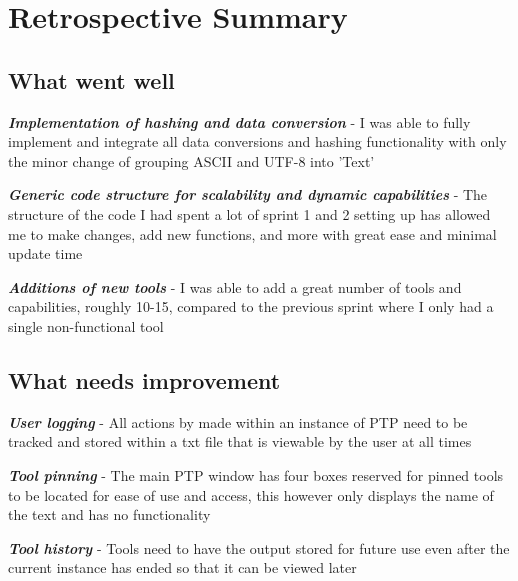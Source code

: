 \documentclass{article}
\begin{document}
\newpage
\section{Retrospective Summary}
\subsection{What went well}
\begin{center}
    \textbf{\textit{Implementation of hashing and data conversion}} - I was able to fully implement and integrate all data conversions and hashing functionality with only the minor change of grouping ASCII and UTF-8 into 'Text'
\end{center}
\begin{center}
    \textbf{\textit{Generic code structure for scalability and dynamic capabilities}} - The structure of the code I had spent a lot of sprint 1 and 2 setting up has allowed me to make changes, add new functions, and more with great ease and minimal update time
\end{center}
\begin{center}
    \textbf{\textit{Additions of new tools}} - I was able to add a great number of tools and capabilities, roughly 10-15, compared to the previous sprint where I only had a single non-functional tool
\end{center}

\subsection{What needs improvement}
\begin{center}
    \textbf{\textit{User logging}} - All actions by made within an instance of PTP need to be tracked and stored within a txt file that is viewable by the user at all times
\end{center}
\begin{center}
    \textbf{\textit{Tool pinning}} - The main PTP window has four boxes reserved for pinned tools to be located for ease of use and access, this however only displays the name of the text and has no functionality
\end{center}
\begin{center}
    \textbf{\textit{Tool history}} - Tools need to have the output stored for future use even after the current instance has ended so that it can be viewed later
\end{center}
\end{document}
